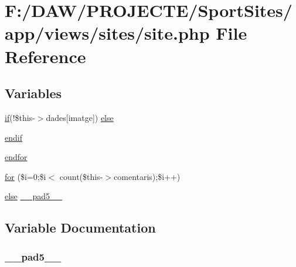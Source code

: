 \hypertarget{site_8php}{}\section{F\+:/\+D\+A\+W/\+P\+R\+O\+J\+E\+C\+T\+E/\+Sport\+Sites/app/views/sites/site.php File Reference}
\label{site_8php}
\subsection*{Variables}
\begin{DoxyCompactItemize}
\item 
\hyperlink{app_2views_2index_2index_8php_af71ebd4d252438a1590e85e150ce8954}{if}(!\$this-\/$>$dades\mbox{[}\textquotesingle{}imatge\textquotesingle{}\mbox{]}) \hyperlink{site_8php_a9110d517276b004ff722e2e05ebdf1c1}{else}
\item 
\hyperlink{site_8php_a82cd33ca97ff99f2fcc5e9c81d65251b}{endif}
\item 
\hyperlink{site_8php_ae8fdc27183f296411bac00ed522ee1ac}{endfor}
\item 
\hyperlink{site_8php_a885711913d29ae0d9a5992ad9d7c7410}{for} (\$i=0;\$i$<$ count(\$this-\/$>$comentaris);\$i++)
\item 
\hyperlink{header_8php_ae69d798cba64778886b1a564b11f2793}{else} \hyperlink{site_8php_a7c49bc58fb30f37aad799fdeb4877a8b}{\+\_\+\+\_\+pad5\+\_\+\+\_\+}
\end{DoxyCompactItemize}


\subsection{Variable Documentation}
\hypertarget{site_8php_a7c49bc58fb30f37aad799fdeb4877a8b}{}
\subsubsection[{\+\_\+\+\_\+pad5\+\_\+\+\_\+}]{ \+\_\+\+\_\+pad5\+\_\+\+\_\+}\label{site_8php_a7c49bc58fb30f37aad799fdeb4877a8b}
\hypertarget{site_8php_a9110d517276b004ff722e2e05ebdf1c1}{}
